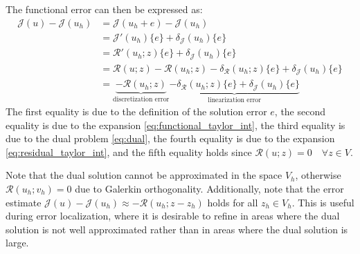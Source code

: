 \documentclass{article}
\newcommand{\R}{\mathcal{R}}
\newcommand{\J}{\mathcal{J}}
\begin{document}
The functional error can then be expressed as:
\begin{equation*}
\begin{aligned}
\J(u) - \J(u_h) &= \J(u_h+e) - \J(u_h) \\
&= \J'(u_h)\{e\} + \delta_{\J}(u_h)\{e\} \\
&= \R'(u_h; z)\{e\} + \delta_{\J}(u_h)\{e\} \\
&= \R(u; z) - \R(u_h; z) - \delta_{\R}(u_h;z)\{e\} + \delta_{\J}(u_h)\{e\} \\
&= 
\underbrace{-\R(u_h; z)}_{\text{discretization error}}
\underbrace{-\delta_{\R}(u_h;z)\{e\} + \delta_{\J}(u_h)\{e\}}
_{\text{linearization error}}
\end{aligned}
\end{equation*}
%
The first equality is due to the definition of
the solution error $e$, the second equality is due
to the expansion \eqref{eq:functional_taylor_int},
the third equality is due to the dual problem
\eqref{eq:dual}, the fourth equality is due to the
expansion \eqref{eq:residual_taylor_int}, and the
fifth equality holds since $\R(u;z) = 0 \quad \forall
z \in V$.

Note that the dual solution cannot be approximated
in the space $V_h$, otherwise $\R(u_h; v_h) = 0$ due
to Galerkin orthogonality. Additionally, note that the
error estimate $\J(u) - \J(u_h) \approx - \R(u_h; z - z_h)$
holds for all $z_h \in V_h$. This is useful during
error localization, where it is desirable to refine
in areas where the dual solution is not well approximated
rather than in areas where the dual solution is large.
\end{document}
